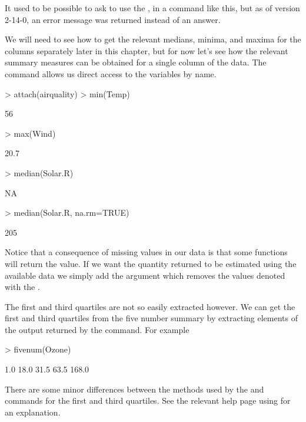 It used to be possible to ask \R{} to use the , in a command like this, but as of version 2-14-0, an error message was returned instead of an answer.

We will need to see how to get the relevant medians, minima, and maxima for the columns separately later in this chapter, but for now let's see how the relevant summary measures can be obtained for a single column of the  data. The  command allows us direct access to the variables by name.
\begin{Schunk}
\begin{Sinput}
> attach(airquality)
> min(Temp)
\end{Sinput}
\begin{Soutput}
[1] 56
\end{Soutput}
\begin{Sinput}
> max(Wind)
\end{Sinput}
\begin{Soutput}
[1] 20.7
\end{Soutput}
\begin{Sinput}
> median(Solar.R)
\end{Sinput}
\begin{Soutput}
[1] NA
\end{Soutput}
\begin{Sinput}
> median(Solar.R, na.rm=TRUE)
\end{Sinput}
\begin{Soutput}
[1] 205
\end{Soutput}
\end{Schunk}
Notice that a consequence of missing values in our data is that some functions will return the  value. If we want the quantity returned to be estimated using the available data we simply add the argument  which removes the values denoted with the .

The first and third quartiles are not so easily extracted however. We can get the first and third quartiles from the five number summary by extracting elements of the output returned by the  command. For example
\begin{Schunk}
\begin{Sinput}
> fivenum(Ozone)
\end{Sinput}
\begin{Soutput}
[1]   1.0  18.0  31.5  63.5 168.0
\end{Soutput}
\end{Schunk}
There are some minor differences between the methods used by the  and  commands for the first and third quartiles. See the relevant help page using  for an explanation.

